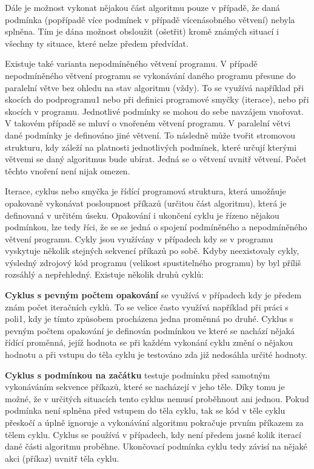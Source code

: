 Dále je možnost vykonat nějakou část algoritmu pouze v případě, že daná podmínka (popřípadě více podmínek v případě vícenásobného větvení) nebyla splněna. Tím je dána možnost obsloužit (ošetřit) kromě známých situací i všechny ty situace, které nelze předem předvídat.

Existuje také varianta nepodmíněného větvení programu. V případě nepodmíněného větvení programu se vykonávání daného programu přesune do paralelní větve bez ohledu na stav algoritmu (vždy). To se využívá například při skocích do podprogramu1 nebo při definici programové smyčky (iterace), nebo při skocích v programu.
Jednotlivé podmínky se mohou do sebe navzájem vnořovat. V takovém případě se mluví o vnořeném větvení programu. V paralelní větvi dané podmínky je definováno jiné větvení. To následně může tvořit stromovou strukturu, kdy záleží na platnosti jednotlivých podmínek, které určují kterými větvemi se daný algoritmus bude ubírat. Jedná se o větvení uvnitř větvení. Počet těchto vnoření není nijak omezen. 

Iterace, cyklus nebo smyčka je řídící programová struktura, která umožňuje opakovaně vykonávat posloupnost příkazů (určitou část algoritmu), která je definovaná v určitém úseku. Opakování i ukončení cyklu je řízeno nějakou podmínkou, lze tedy říci, že se se jedná o spojení podmíněného a nepodmíněného větvení programu. Cykly jsou využívány v případech kdy se v programu vyskytuje několik stejných sekvencí příkazů po sobě. Kdyby neexistovaly cykly, výsledný zdrojový kód programu (velikost spustitelného programu) by byl příliš rozsáhlý a nepřehledný.
Existuje několik druhů cyklů:

\vskip 4mm
\vskip 4mm

{\bf Cyklus s pevným počtem opakování} se využívá v případech kdy je předem znám počet iteračních cyklů. To se velice často využívá například při práci s poli1, kdy je tímto způsobem procházena jedna proměnná po druhé. Cyklus s pevným počtem opakování je definován podmínkou ve které se nachází nějaká řídící proměnná, jejíž hodnota se při každém vykonání cyklu změní o nějakou hodnotu a při vstupu do těla cyklu je testováno zda již nedosáhla určité hodnoty.

{\bf Cyklus s podmínkou na začátku} testuje podmínku před samotným vykonáváním sekvence příkazů, které se nacházejí v jeho těle. Díky tomu je možné, že v určitých situacích tento cyklus nemusí proběhnout ani jednou. Pokud podmínka není splněna před vstupem do těla cyklu, tak se kód v těle cyklu přeskočí a úplně ignoruje a vykonávání algoritmu pokračuje prvním příkazem za tělem cyklu. Cyklus se používá v případech, kdy není předem jasné kolik iterací dané části algoritmu  proběhne. Ukončovací podmínka cyklu tedy závisí na nějaké akci (příkaz) uvnitř těla cyklu.

